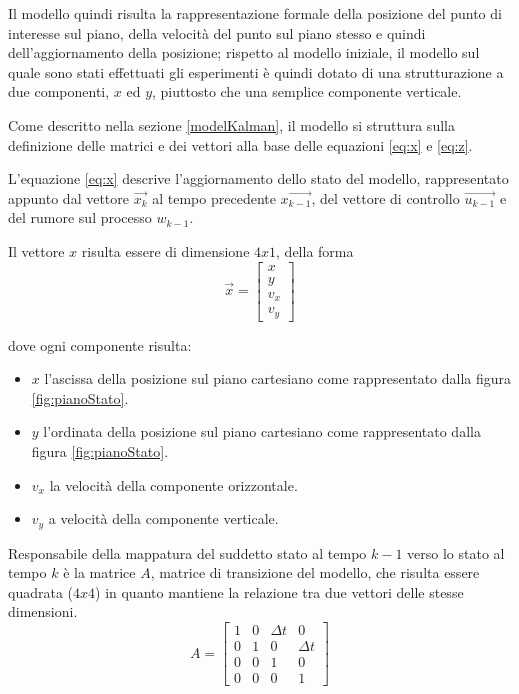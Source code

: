 Il modello quindi risulta la rappresentazione formale della posizione del punto di interesse sul piano, della velocità del punto sul piano stesso e quindi dell'aggiornamento della posizione; rispetto al modello iniziale, il modello sul quale sono stati effettuati gli esperimenti è quindi dotato di una strutturazione a due componenti, $x$ ed $y$, piuttosto che una semplice componente verticale.%

Come descritto nella sezione \ref{modelKalman}, il modello si struttura sulla definizione delle matrici e dei vettori alla base delle equazioni \ref{eq:x} e \ref{eq:z}.

L'equazione \ref{eq:x} descrive l'aggiornamento dello stato del modello, rappresentato appunto dal vettore $\overrightarrow{x_k}$ al tempo precedente $\overrightarrow{x_{k-1}}$, del vettore di controllo $\overrightarrow{u_{k-1}}$ e del rumore sul processo $w_{k-1}$. 

Il vettore $x$ risulta essere di dimensione $4 x 1$, della forma 
\begin{equation}\label{eq:vettoreX}
 \overrightarrow{x}=\begin{bmatrix} x \\ y \\ v_x \\ v_y \end{bmatrix}
\end{equation} 

dove ogni componente risulta:
\begin{itemize}
\item $x$ l'ascissa della posizione sul piano cartesiano come rappresentato dalla figura \ref{fig:pianoStato}.
\item $y$ l'ordinata della posizione sul piano cartesiano come rappresentato dalla figura \ref{fig:pianoStato}.
\item $v_x$ la velocità della componente orizzontale.
\item $v_y$ a velocità della componente verticale.
\end{itemize}

Responsabile della mappatura del suddetto stato al tempo $k-1$ verso lo stato al tempo $k$ è la matrice $A$, matrice di transizione del modello, che risulta essere quadrata ($4 x 4$) in quanto mantiene la relazione tra due vettori delle stesse dimensioni.
\begin{equation}\label{eq:matriceA}
 A = 
\begin{bmatrix}
 1 & 0 & \Delta t & 0 \\
 0 & 1 & 0 & \Delta t \\
 0 & 0 & 1 & 0 \\
 0 & 0 & 0 & 1
\end{bmatrix}
\end{equation} 

